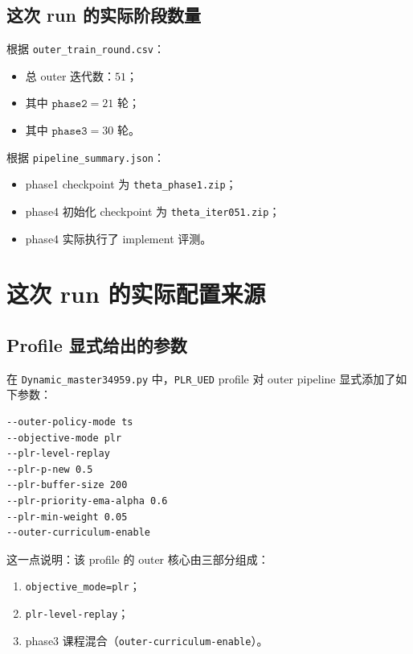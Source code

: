 \documentclass[11pt,a4paper]{ctexart}
\begin{document}
\subsection{这次 run 的实际阶段数量}
根据 \texttt{outer\_train\_round.csv}：
\begin{itemize}[leftmargin=2.2em,itemsep=0.2em]
    \item 总 outer 迭代数：\(51\)；
    \item 其中 \(\texttt{phase2}=21\) 轮；
    \item 其中 \(\texttt{phase3}=30\) 轮。
\end{itemize}

根据 \texttt{pipeline\_summary.json}：
\begin{itemize}[leftmargin=2.2em,itemsep=0.2em]
    \item phase1 checkpoint 为 \texttt{theta\_phase1.zip}；
    \item phase4 初始化 checkpoint 为 \texttt{theta\_iter051.zip}；
    \item phase4 实际执行了 implement 评测。
\end{itemize}

\section{这次 run 的实际配置来源}

\subsection{Profile 显式给出的参数}
在 \texttt{Dynamic\_master34959.py} 中，\texttt{PLR\_UED} profile 对 outer pipeline 显式添加了如下参数：
\begin{lstlisting}
--outer-policy-mode ts
--objective-mode plr
--plr-level-replay
--plr-p-new 0.5
--plr-buffer-size 200
--plr-priority-ema-alpha 0.6
--plr-min-weight 0.05
--outer-curriculum-enable
\end{lstlisting}

这一点说明：该 profile 的 outer 核心由三部分组成：
\begin{enumerate}[leftmargin=2.2em,itemsep=0.2em]
    \item \texttt{objective\_mode=plr}；
    \item \texttt{plr-level-replay}；
    \item phase3 课程混合（\texttt{outer-curriculum-enable}）。
\end{enumerate}
\end{document}
